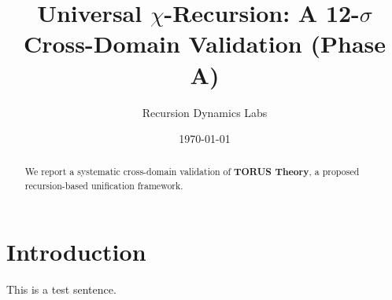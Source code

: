 \documentclass{article}
\title{Universal $\chi$-Recursion: A 12-$\sigma$ Cross-Domain Validation (Phase A)}
\author{Recursion Dynamics Labs}
\date{\today}
\begin{document}
\maketitle
\begin{abstract}
We report a systematic cross-domain validation of \textbf{TORUS Theory}, a proposed recursion-based unification framework.
\end{abstract}

\section{Introduction}\label{sec:intro}
This is a test sentence.
\end{document}
